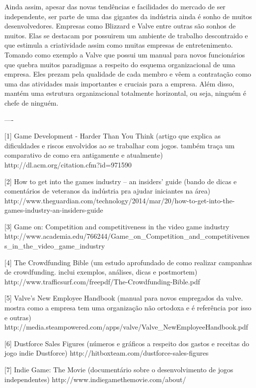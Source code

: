 Ainda assim, apesar das novas tendências e facilidades do mercado de ser independente, ser parte de uma das gigantes da indústria ainda é sonho de muitos desenvolvedores. Empresas como Blizzard e Valve entre outras são sonhos de muitos. Elas se destacam por possuirem um ambiente de trabalho descontraido e que estimula a criatividade assim como muitas empresas de entretenimento. Tomando como exemplo a Valve que possui um manual para novos funcionários que quebra muitos paradigmas a respeito do esquema organizacional de uma empresa. Eles prezam pela qualidade de cada membro e vêem a contratação como uma das atividades mais importantes e cruciais para a empresa. Além disso, mantém uma estrutura organizacional totalmente horizontal, ou seja, ninguém é chefe de ninguém.

----

[1] Game Development - Harder Than You Think
(artigo que explica as dificuldades e riscos envolvidos ao se trabalhar com jogos. também traça um comparativo de como era antigamente e atualmente)
http://dl.acm.org/citation.cfm?id=971590

[2] How to get into the games industry – an insiders' guide
(bando de dicas e comentários de veteranos da indústria pra ajudar iniciantes na área)
http://www.theguardian.com/technology/2014/mar/20/how-to-get-into-the-games-industry-an-insiders-guide

[3] Game on: Competition and competitiveness in the video game industry
http://www.academia.edu/766244/Game_on_Competition_and_competitiveness_in_the_video_game_industry

[4] The Crowdfunding Bible
(um estudo aprofundado de como realizar campanhas de crowdfunding. inclui exemplos, análises, dicas e postmortem)
http://www.trafficsurf.com/freepdf/The-Crowdfunding-Bible.pdf

[5] Valve's New Employee Handbook
(manual para novos empregados da valve. mostra como a empresa tem uma organização não ortodoxa e é referência por isso e outras)
http://media.steampowered.com/apps/valve/Valve_NewEmployeeHandbook.pdf

[6] Dustforce Sales Figures
(números e gráficos a respeito dos gastos e receitas do jogo indie Dustforce)
http://hitboxteam.com/dustforce-sales-figures

[7] Indie Game: The Movie
(documentário sobre o desenvolvimento de jogos independentes)
http://www.indiegamethemovie.com/about/
